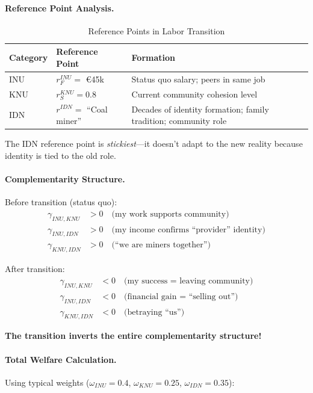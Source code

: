 \paragraph{Reference Point Analysis.}

\begin{table}[htbp]
\centering
\caption{Reference Points in Labor Transition}
\label{tab:labor-reference}
\renewcommand{\arraystretch}{1.3}
\begin{tabular}{@{}llp{6cm}@{}}
\toprule
\textbf{Category} & \textbf{Reference Point} & \textbf{Formation} \\
\midrule
INU & $r^{INU}_F = $ \euro{45k} & Status quo salary; peers in same job \\
KNU & $r^{KNU}_S = 0.8$ & Current community cohesion level \\
IDN & $r^{IDN} = $ ``Coal miner'' & Decades of identity formation; family tradition; community role \\
\bottomrule
\end{tabular}
\end{table}

The IDN reference point is \emph{stickiest}---it doesn't adapt to the new 
reality because identity is tied to the old role.

\paragraph{Complementarity Structure.}
Before transition (status quo):
\begin{align}
\gamma_{INU,KNU} &> 0 \quad \text{(my work supports community)} \\
\gamma_{INU,IDN} &> 0 \quad \text{(my income confirms ``provider'' identity)} \\
\gamma_{KNU,IDN} &> 0 \quad \text{(``we are miners together'')}
\end{align}

After transition:
\begin{align}
\gamma_{INU,KNU} &< 0 \quad \text{(my success = leaving community)} \\
\gamma_{INU,IDN} &< 0 \quad \text{(financial gain = ``selling out'')} \\
\gamma_{KNU,IDN} &< 0 \quad \text{(betraying ``us'')}
\end{align}

\textbf{The transition inverts the entire complementarity structure!}

\paragraph{Total Welfare Calculation.}
Using typical weights ($\omega_{INU} = 0.4$, $\omega_{KNU} = 0.25$, $\omega_{IDN} = 0.35$):

